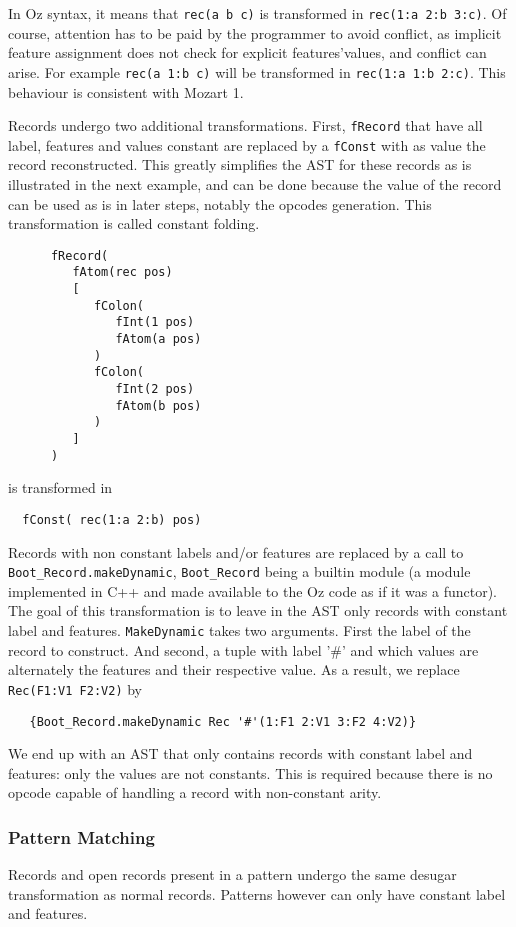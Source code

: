 \documentclass[a4paper]{memoir}
\begin{document}
In Oz syntax, it means that \lstinline!rec(a b c)! is transformed in
\lstinline!rec(1:a 2:b 3:c)!. Of course, attention has to be paid by the
programmer to avoid conflict, as implicit feature assignment does not check for
explicit features'values, and conflict can arise. For example \lstinline!rec(a 1:b c)! will be transformed in \lstinline!rec(1:a 1:b 2:c)!. This behaviour is
consistent with Mozart 1.

Records undergo two additional transformations. First, \lstinline!fRecord! that
have all label, features and values constant are replaced by a
\lstinline!fConst! with as value the record reconstructed. This greatly
simplifies the AST for these records as is illustrated in the next example, and
can be done because the value of the record can be used as is in later steps,
notably the opcodes generation. This transformation is called constant folding.
\begin{lstlisting}
      fRecord(
         fAtom(rec pos)
         [
            fColon(
               fInt(1 pos)
               fAtom(a pos)
            )
            fColon(
               fInt(2 pos)
               fAtom(b pos)
            )
         ]
      )
\end{lstlisting}
is transformed in
\begin{lstlisting}
  fConst( rec(1:a 2:b) pos)
\end{lstlisting}


Records with non constant labels and/or features are replaced by a call to
\lstinline!Boot_Record.makeDynamic!, \lstinline!Boot_Record! being a builtin module (a module implemented in C++ and made available to the Oz code as if it was a functor). The goal of this transformation is to leave
in the AST only records with constant label and features.
\lstinline!MakeDynamic! takes two arguments. First the label of the record to construct. And second, a tuple with label '\#' and which values are alternately the features and their respective value. As a result, we replace \lstinline!Rec(F1:V1 F2:V2)! by 
\begin{lstlisting}
   {Boot_Record.makeDynamic Rec '#'(1:F1 2:V1 3:F2 4:V2)}
\end{lstlisting}

We end up with an AST that only contains records with constant label and features: only the values are not constants.
This is required because there is no opcode capable of handling a record with non-constant arity.

\subsubsection{Pattern Matching}
Records and open records present in a pattern undergo the same desugar
transformation as normal records. Patterns however can only have constant label
and features.
\end{document}

